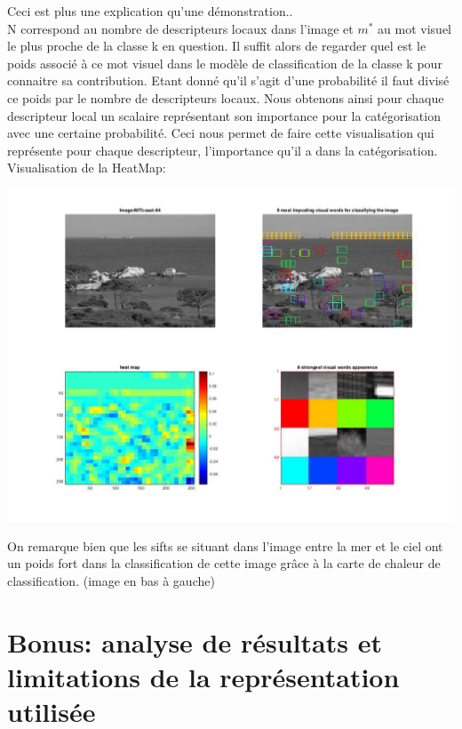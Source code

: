 \documentclass[a4paper]{article}
\begin{document}
Ceci est plus une explication qu'une démonstration..\\
N correspond au nombre de descripteurs locaux dans l'image et $m^*$ au mot visuel le plus proche de la classe k en question. Il suffit alors de regarder quel est le poids associé à ce mot visuel dans le modèle de classification de la classe k pour connaitre sa contribution. Etant donné qu'il s'agit d'une probabilité il faut divisé ce poids par le nombre de descripteurs locaux. Nous obtenons ainsi pour chaque descripteur local un scalaire représentant son importance pour la catégorisation avec une certaine probabilité. Ceci nous permet de faire cette visualisation qui représente pour chaque descripteur, l'importance qu'il a dans la catégorisation. \\
Visualisation de la HeatMap:\\

\begin{center}
\includegraphics[scale=0.3]{heatMap}
\end{center}
On remarque bien que les sifts se situant dans l'image entre la mer et le ciel ont un poids fort dans la classification de cette image grâce à la carte de chaleur de classification. (image en bas à gauche)\\



\section{Bonus: analyse de résultats et limitations de la représentation utilisée}
\end{document}
